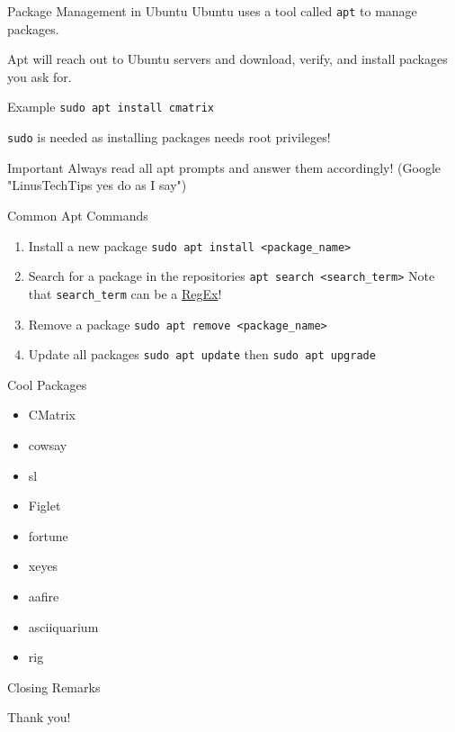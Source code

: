 \documentclass{beamer}
\begin{document}
\begin{frame}{Package Management in Ubuntu}
	Ubuntu uses a tool called \texttt{apt} to manage packages.

	Apt will reach out to Ubuntu servers and download, verify, and install
	packages you ask for.

	\begin{exampleblock}{Example}
		\texttt{sudo apt install cmatrix}

		\texttt{sudo} is needed as installing packages needs root privileges!
	\end{exampleblock}
\end{frame}

\begin{frame}{Important}
	Always read all apt prompts and answer them accordingly!
	(Google "LinusTechTips yes do as I say")
\end{frame}

\begin{frame}{Common Apt Commands}
	\begin{enumerate}
		\item Install a new package \texttt{sudo apt install
			<package\_name>}
		\item Search for a package in the repositories \texttt{apt
			search <search\_term>} Note that \texttt{search\_term}
			can be a \underline{RegEx}!
		\item Remove a package \texttt{sudo apt remove <package\_name>}
		\item Update all packages \texttt{sudo apt update} then
			\texttt{sudo apt upgrade}
	\end{enumerate}
\end{frame}

\begin{frame}{Cool Packages}
	\begin{itemize}
		\item CMatrix
		\item cowsay
		\item sl
		\item Figlet
		\item fortune
		\item xeyes
		\item aafire
		\item asciiquarium
		\item rig
	\end{itemize}
\end{frame}

\begin{frame}{Closing Remarks}
	\begin{center}
		\Huge Thank you!
	\end{center}
\end{frame}
\end{document}
